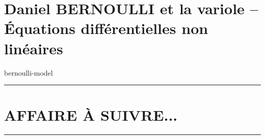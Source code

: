\documentclass[12pt]{amsart}
\let\oldsection\section
\renewcommand\section[1]{\vfill\pagebreak\oldsection{#1}}
\begin{document}


\section{Daniel BERNOULLI et la variole -- Équations différentielles non linéaires}

{bernoulli-model}




%



\bigskip

\hrule

\oldsection{AFFAIRE À SUIVRE...}

\bigskip

\hrule
\end{document}
